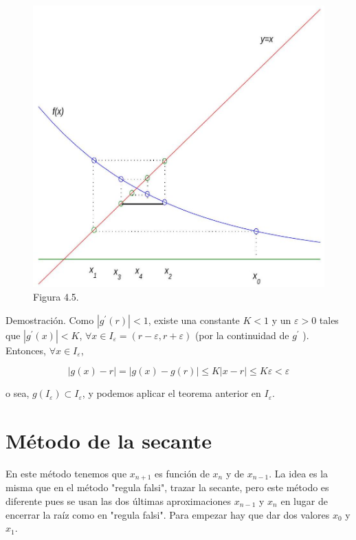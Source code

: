 \documentclass[10pt]{book}
\begin{document}
\begin{figure}[h]
\begin{center}
  \includegraphics[width=\textwidth]{2025_09_05_3888c9ac96bd653d96b4g-083}
\captionsetup{labelformat=empty}
\caption{Figura 4.5.}
\end{center}
\end{figure}

Demostración. Como $\left|g^{\prime}(r)\right|<1$, existe una constante $K<1$ y un $\varepsilon>0$ tales que $\left|g^{\prime}(x)\right|<K$, $\forall x \in I_{\varepsilon}=(r-\varepsilon, r+\varepsilon)$ (por la continuidad de $g^{\prime}$ ). Entonces, $\forall x \in I_{\varepsilon}$,

$$
|g(x)-r|=|g(x)-g(r)| \leq K|x-r| \leq K \varepsilon<\varepsilon
$$

o sea, $g\left(I_{\varepsilon}\right) \subset I_{\varepsilon}$, y podemos aplicar el teorema anterior en $I_{\varepsilon}$.

\section{Método de la secante}
En este método tenemos que $x_{n+1}$ es función de $x_{n}$ y de $x_{n-1}$. La idea es la misma que en el método "regula falsi", trazar la secante, pero este método es diferente pues se usan las dos últimas aproximaciones $x_{n-1}$ y $x_{n}$ en lugar de encerrar la raíz como en "regula falsi". Para empezar hay que dar dos valores $x_{0}$ y $x_{1}$.
\end{document}
